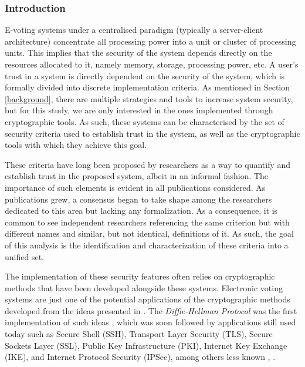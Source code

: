 \documentclass[../access.tex]{subfiles}
\begin{document}
    \label{centralized-analysis}
    \subsubsection{Introduction}
    E-voting systems under a centralised paradigm (typically a server-client architecture) concentrate all processing power into a unit or cluster of processing units. This implies that the security of the system depends directly on the resources allocated to it, namely memory, storage, processing power, etc. A user's trust in a system is directly dependent on the security of the system, which is formally divided into discrete implementation criteria. As mentioned in Section \ref{background}, there are multiple strategies and tools to increase system security, but for this study, we are only interested in the ones implemented through cryptographic tools. As such, these systems can be characterised by the set of security criteria used to establish trust in the system, as well as the cryptographic tools with which they achieve this goal.
    \par
    These criteria have long been proposed by researchers as a way to quantify and establish trust in the proposed system, albeit in an informal fashion. The importance of such elements is evident in all publications considered. As publications grew, a consensus began to take shape among the researchers dedicated to this area but lacking any formalization. As a consequence, it is common to see independent researchers referencing the same criterion but with different names and similar, but not identical, definitions of it. As such, the goal of this analysis is the identification and characterization of these criteria into a unified set.
    \par
    The implementation of these security features often relies on cryptographic methods that have been developed alongside these systems. Electronic voting systems are just one of the potential applications of the cryptographic methods developed from the ideas presented in \cite{Diffie1976}. The \textit{Diffie-Hellman Protocol} was the first implementation of such ideas \cite{Maurer2000}, which was soon followed by applications still used today such as Secure Shell (SSH), Transport Layer Security (TLS), Secure Sockets Layer (SSL), Public Key Infrastructure (PKI), Internet Key Exchange (IKE), and Internet Protocol Security (IPSec), among others less known \cite{Diffie1988}, \cite{Schneider1994} \cite{Ahmed2012}.
\end{document}
